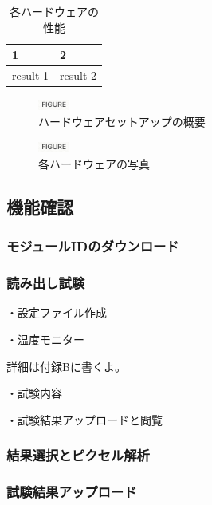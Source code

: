 \begin{table}[tbp]
\begin{center}
\caption[各ハードウェアの性能]{各ハードウェアの性能}
\label{readout_setup_table}
  \begin{tabular}{|ll|} \hline
    1 & 2 \\ \hline
    result 1 & result 2 \\ \hline 
  \end{tabular}
\end{center}
\end{table}

\begin{figure}[bpt]\centering
\includegraphics[width=1cm]{figure}
\caption[ハードウェアセットアップの概要]{ハードウェアセットアップの概要}
\label{readout_setup_overview}
\end{figure}

\begin{figure}[bpt]\centering
\includegraphics[width=1cm]{figure}
\caption[各ハードウェアの写真]{各ハードウェアの写真}
\label{readout_setup_picture}
\end{figure}

\subsection{機能確認}
\subsubsection{モジュールIDのダウンロード}


\subsubsection{読み出し試験}

・設定ファイル作成

・温度モニター

詳細は付録Bに書くよ。

・試験内容

・試験結果アップロードと閲覧

\subsubsection{結果選択とピクセル解析}

\subsubsection{試験結果アップロード}

